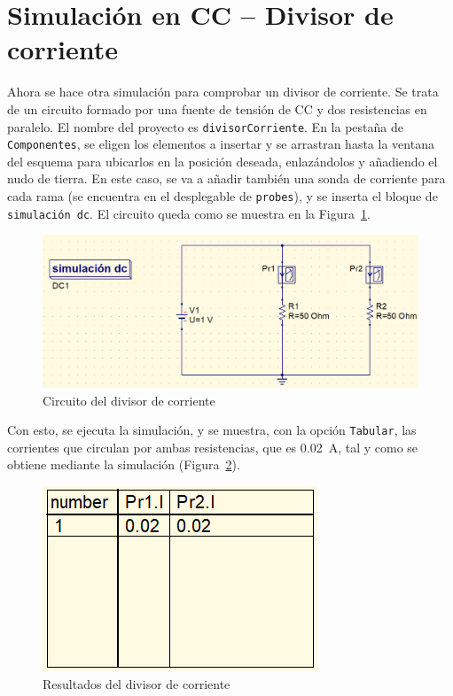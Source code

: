 \documentclass[a4paper,10pt]{article} %
\begin{document}
\section{Simulación en CC -- Divisor de corriente}

Ahora se hace otra simulación para comprobar un divisor de corriente. Se trata de un circuito formado por una fuente de tensión de CC y dos resistencias en paralelo. El nombre del proyecto es \texttt{divisorCorriente}. En la pestaña de \texttt{Componentes}, se eligen los elementos a insertar y se arrastran hasta la ventana del esquema para ubicarlos en la posición deseada, enlazándolos y añadiendo el nudo de tierra. En este caso, se va a añadir también una sonda de corriente para cada rama (se encuentra en el desplegable de \texttt{probes}), y se inserta el bloque de \texttt{simulación dc}. El circuito queda como se muestra en la Figura~\ref{fig.qucs18}.
\begin{figure}[htbp]
    \centering
    \includegraphics[width=0.5\linewidth]{../figs/qucs18.PNG}
    \caption{Circuito del divisor de corriente}
    \label{fig.qucs18}
\end{figure}

Con esto, se ejecuta la simulación, y se muestra, con la opción \texttt{Tabular}, las corrientes que circulan por ambas resistencias, que es \qty{0.02}{\ampere}, tal y como se obtiene mediante la simulación (Figura~\ref{fig.qucs19}).
\begin{figure}[htbp]
    \centering
    \includegraphics[width=0.25\linewidth]{../figs/qucs19.PNG}
    \caption{Resultados del divisor de corriente}
    \label{fig.qucs19}
\end{figure}
\end{document}
